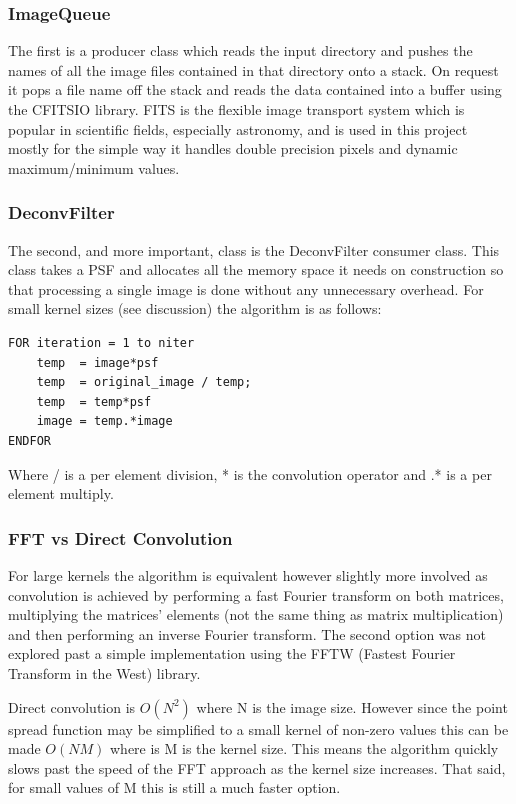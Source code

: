 \documentclass{article}
\begin{document}
\subsubsection{ImageQueue}
The first is a producer class which
reads the input directory and pushes the names of all the image files contained in that
directory onto a stack. On request it pops a file name off the stack and reads the
data contained into a buffer using the CFITSIO library. FITS is the flexible
image transport system which is popular in scientific fields, especially
astronomy, and is used in this project mostly for the simple way it handles
double precision pixels and dynamic maximum/minimum values.

\subsubsection{DeconvFilter}
The second, and more important, class is the DeconvFilter consumer class.
This class takes a PSF and allocates all the memory space it needs on
construction so that processing a single image is done without any unnecessary
overhead. For small kernel sizes (see discussion) the algorithm is as follows:
\begin{verbatim}
FOR iteration = 1 to niter
    temp  = image*psf
    temp  = original_image / temp;
    temp  = temp*psf
    image = temp.*image
ENDFOR
\end{verbatim}
Where / is a per element division, * is the convolution operator and .* is a per
element multiply.

\subsubsection{FFT vs Direct Convolution}
For large kernels the algorithm is equivalent however slightly more involved as
convolution is achieved by performing a fast Fourier transform on both matrices,
multiplying the matrices' elements (not the same thing as matrix multiplication)
and then performing an inverse Fourier transform. The second option was not
explored past a simple implementation using the FFTW (Fastest Fourier Transform
in the West) library.

Direct convolution is $O(N^2)$ where N is the image size.
However since the point spread function may be simplified to a small kernel of
non-zero values this can be made $O(NM)$ where is M is the kernel size. This
means the algorithm quickly slows past the speed of the FFT approach
as the kernel size increases. That said, for small values of M this is still
a much faster option.
\end{document}
